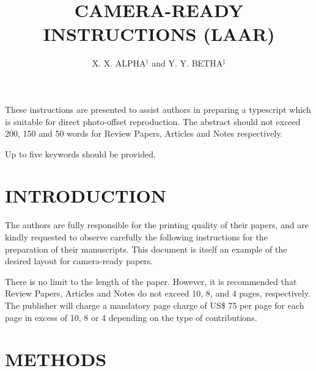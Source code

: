 %



%


\title{CAMERA-READY INSTRUCTIONS (LAAR)}
\author{X. X. ALPHA$^{\dag }$ and Y. Y. BETHA$^{\ddag }$}
\maketitle

\abstract
These instructions are presented to assist authors in preparing a typescript
which is suitable for direct photo-offset reproduction. The abstract should
not exceed 200, 150 and 50 words for Review Papers, Articles and Notes
respectively.\endabstract

\keywords%
Up to five keywords should be provided.\endkeywords

\section{INTRODUCTION}

The authors are fully responsible for the printing quality of their papers,
and are kindly requested to observe carefully the following instructions for
the preparation of their manuscripts. This document is itself an example of
the desired layout for camera-ready papers.

There is no limit to the length of the paper. However, it is recommended
that Review Papers, Articles and Notes do not exceed 10, 8, and 4 pages,
respectively. The publisher will charge a mandatory page charge of US\$ 75
per page for each page in excess of 10, 8 or 4 depending on the type of
contributions.

\section{METHODS}

